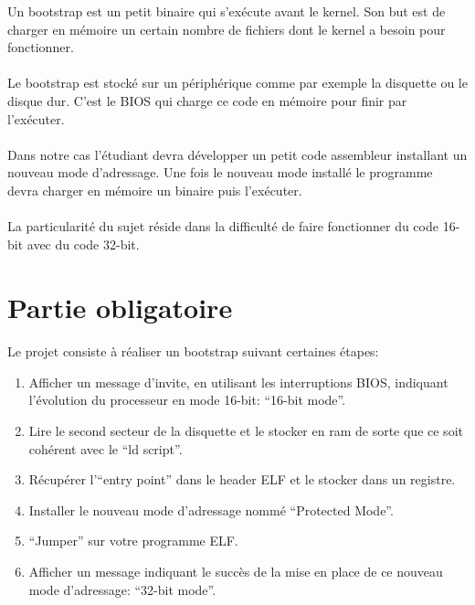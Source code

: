 \documentclass[10pt,a4wide]{article}
\begin{document}
Un bootstrap est un petit binaire qui s'ex\'ecute avant le kernel. Son but
est de charger en m\'emoire un certain nombre de fichiers dont le kernel
a besoin pour fonctionner.

\paragraph{}

Le bootstrap est stock\'e sur un p\'eriph\'erique comme par exemple la
disquette ou le disque dur. C'est le BIOS qui charge ce code en m\'emoire
pour finir par l'ex\'ecuter.

\paragraph{}

Dans notre cas l'\'etudiant devra d\'evelopper un petit code assembleur
installant un nouveau mode d'adressage. Une fois le nouveau mode install\'e
le programme devra charger en m\'emoire un binaire puis l'ex\'ecuter.

\paragraph{}

La particularit\'e du sujet r\'eside dans la difficult\'e de faire fonctionner
du code 16-bit avec du code 32-bit.

\section{Partie obligatoire}

\paragraph{}

Le projet consiste \`a r\'ealiser un bootstrap suivant certaines \'etapes:

\begin{enumerate}

\item Afficher un message d'invite, en utilisant les interruptions BIOS,
      indiquant l'\'evolution du processeur en mode 16-bit: ``16-bit mode''.

\item Lire le second secteur de la disquette et le stocker en ram de sorte
      que ce soit coh\'erent avec le ``ld script''.

\item R\'ecup\'erer l'``entry point'' dans le header ELF et le stocker
      dans un registre.

\item Installer le nouveau mode d'adressage nomm\'e ``Protected Mode''.

\item ``Jumper'' sur votre programme ELF.

\item Afficher un message indiquant le succ\`es de la mise en place de ce
      nouveau mode d'adressage: ``32-bit mode''.

\end{enumerate}
\end{document}
